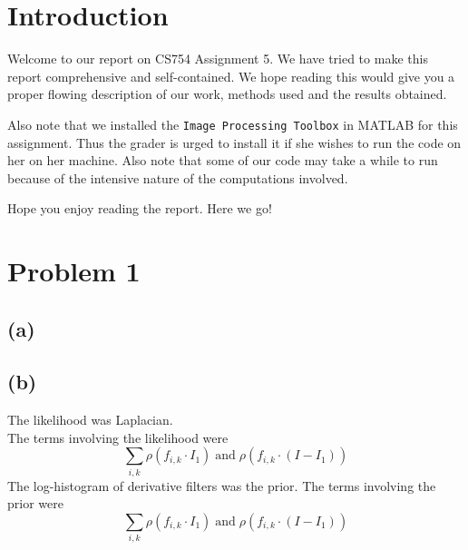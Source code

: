 \documentclass[a4paper,14pt]{article}
\numberwithin{definition}{section}
\numberwithin{mytheorem}{subsection}
\begin{document}

\date{Spring 2022}
\maketitle

\justifying
\tableofcontents

\newpage
\justifying
\section*{Introduction}

Welcome  to our report on CS754 Assignment 5. We have tried to make this report comprehensive and self-contained. We hope reading this would give you a proper flowing description of our work, methods used and the results obtained.

Also note that we installed the \texttt{Image Processing Toolbox} in MATLAB for this assignment. Thus the grader is urged to install it if she wishes to run the code on her on her machine. Also note that some of our code may take a while to run because of the intensive nature of the computations involved.

Hope you enjoy reading the report. Here we go!
\section{Problem 1}
\subsection{(a)}
\subsection{(b)}
The likelihood was Laplacian.\\
The terms involving the likelihood were 
$$\sum_{i, k}\rho(f_{i,k}\cdot I_1)\;\mathrm{and}\;\rho(f_{i,k}\cdot (I-I_1))$$
The log-histogram of derivative filters was the prior.
The terms involving the prior were 
$$\sum_{i, k}\rho(f_{i,k}\cdot I_1)\;\mathrm{and}\;\rho(f_{i,k}\cdot (I-I_1))$$
\end{document}
